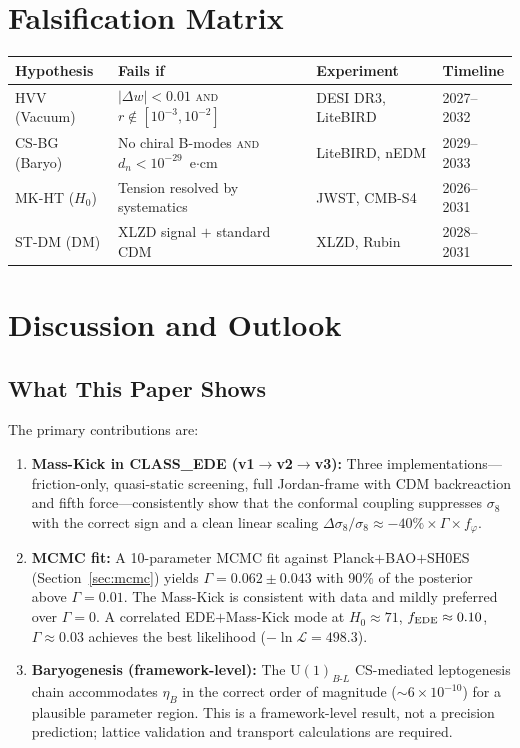 \documentclass[a4paper,11pt]{article}
\newcommand{\fphi}{f_\varphi}
\newcommand{\UBL}{\mathrm{U}(1)_{B\text{-}L}}
\newcommand{\etaB}{\eta_B}
\newcommand{\e}[1]{\times 10^{#1}}
\begin{document}
\section{Falsification Matrix}
\label{sec:falsification}

\begin{center}
\begin{tabular}{llll}
\toprule
\textbf{Hypothesis} & \textbf{Fails if} & \textbf{Experiment} & \textbf{Timeline} \\
\midrule
HVV (Vacuum) & $|\Delta w| < 0.01$ \textsc{and} $r \notin [10^{-3}, 10^{-2}]$ & DESI DR3, LiteBIRD & 2027--2032 \\
CS-BG (Baryo) & No chiral B-modes \textsc{and} $d_n < 10^{-29}$~e$\cdot$cm & LiteBIRD, nEDM & 2029--2033 \\
MK-HT ($H_0$) & Tension resolved by systematics & JWST, CMB-S4 & 2026--2031 \\
ST-DM (DM) & XLZD signal $+$ standard CDM & XLZD, Rubin & 2028--2031 \\
\bottomrule
\end{tabular}
\end{center}


\section{Discussion and Outlook}
\label{sec:discussion}

\subsection{What This Paper Shows}

The primary contributions are:

\begin{enumerate}[nosep]
\item \textbf{Mass-Kick in CLASS\_EDE (v1$\to$v2$\to$v3):} Three implementations---friction-only, quasi-static screening, full Jordan-frame with CDM backreaction and fifth force---consistently show that the conformal coupling suppresses $\sigma_8$ with the correct sign and a clean linear scaling $\Delta\sigma_8/\sigma_8 \approx -40\% \times \Gamma \times \fphi$.

\item \textbf{MCMC fit:} A 10-parameter MCMC fit against Planck$+$BAO$+$SH0ES (Section~\ref{sec:mcmc}) yields $\Gamma = 0.062 \pm 0.043$ with 90\% of the posterior above $\Gamma = 0.01$. The Mass-Kick is consistent with data and mildly preferred over $\Gamma = 0$. A correlated EDE$+$Mass-Kick mode at $H_0 \approx 71$, $f_{\rm EDE} \approx 0.10$, $\Gamma \approx 0.03$ achieves the best likelihood ($-\ln\mathcal{L} = 498.3$).

\item \textbf{Baryogenesis (framework-level):} The $\UBL$ CS-mediated leptogenesis chain accommodates $\etaB$ in the correct order of magnitude ($\sim 6\e{-10}$) for a plausible parameter region. This is a framework-level result, not a precision prediction; lattice validation and transport calculations are required.
\end{enumerate}
\end{document}
